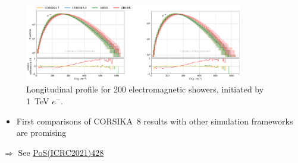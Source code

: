 \begin{frame}[c]
    \begin{figure}
        \centering
        \includegraphics[width=0.85\textwidth]{plots/longitudinal_profile.pdf}
        \caption*{Longitudinal profile for 200 electromagnetic showers, initiated by \SI{1}{\tera\electronvolt} $e^-$.}
    \end{figure}
    \begin{itemize}
        \item First comparisons of CORSIKA~8 results with other simulation frameworks are promising
    \end{itemize}

    \hspace{20pt} $\Rightarrow$ See \href{https://pos.sissa.it/395/428/}{PoS(ICRC2021)428}

\end{frame}



